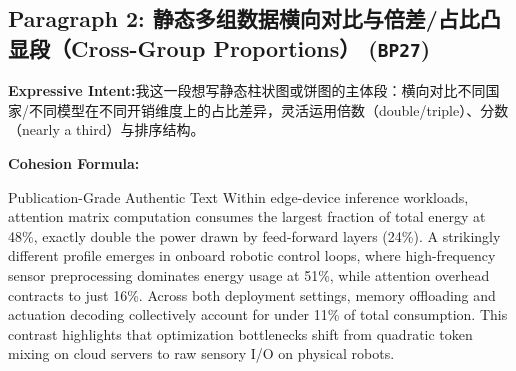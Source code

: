 \subsection*{Paragraph 2: 静态多组数据横向对比与倍差/占比凸显段（Cross-Group Proportions） (\texttt{BP27})}
\noindent\textbf{Expressive Intent:}\enspace 我这一段想写静态柱状图或饼图的主体段：横向对比不同国家/不同模型在不同开销维度上的占比差异，灵活运用倍数（double/triple）、分数（nearly a third）与排序结构。\par
\noindent\textbf{Cohesion Formula:}\par\vspace{4pt}
\begin{ExampleBox}{Publication-Grade Authentic Text}
Within edge-device inference workloads, attention matrix computation consumes the largest fraction of total energy at 48\%, exactly double the power drawn by feed-forward layers (24\%). A strikingly different profile emerges in onboard robotic control loops, where high-frequency sensor preprocessing dominates energy usage at 51\%, while attention overhead contracts to just 16\%. Across both deployment settings, memory offloading and actuation decoding collectively account for under 11\% of total consumption. This contrast highlights that optimization bottlenecks shift from quadratic token mixing on cloud servers to raw sensory I/O on physical robots.
\end{ExampleBox}
